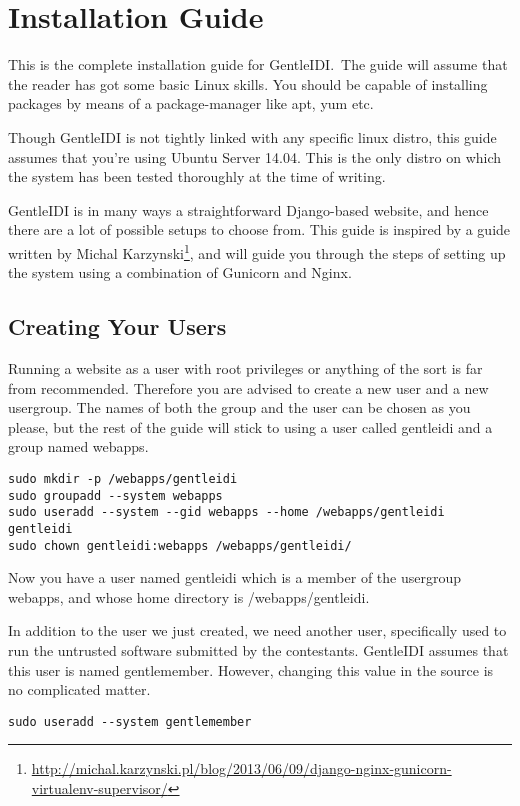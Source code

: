 \chapter{Installation Guide}
This is the complete installation guide for GentleIDI.\ The guide will assume
that the reader has got some basic Linux skills. You should be
capable of installing packages by means of a package-manager like apt,
yum etc.

Though GentleIDI is not tightly linked with any specific linux distro,
this guide assumes that you're using Ubuntu Server
14.04. This is the only distro on which the system has been tested
thoroughly at the time of writing.

GentleIDI is in many ways a straightforward Django-based website, and
hence there are a lot of possible setups to choose from. This guide is
inspired by a guide written by Michal Karzynski\footnote{\url{http://michal.karzynski.pl/blog/2013/06/09/django-nginx-gunicorn-virtualenv-supervisor/}}, and will guide you
through the steps of setting up the system using a combination of
Gunicorn and Nginx.

\section{Creating Your Users}
Running a website as a user with root privileges or anything of the sort
is far from recommended. Therefore you are advised to create a new
user and a new usergroup. The names of both the group and the user can
be chosen as you please, but the rest of the guide will stick to using
a user called gentleidi and a group named webapps.

\begin{verbatim}
sudo mkdir -p /webapps/gentleidi
sudo groupadd --system webapps
sudo useradd --system --gid webapps --home /webapps/gentleidi gentleidi
sudo chown gentleidi:webapps /webapps/gentleidi/
\end{verbatim}

Now you have a user named gentleidi which is a member of the usergroup
webapps, and whose home directory is /webapps/gentleidi.

In addition to the user we just created, we need another user,
specifically used to run the untrusted software submitted by the
contestants. GentleIDI assumes that this user is named gentlemember.
However, changing this value in the source is no complicated matter.

\begin{verbatim}
sudo useradd --system gentlemember
\end{verbatim}

